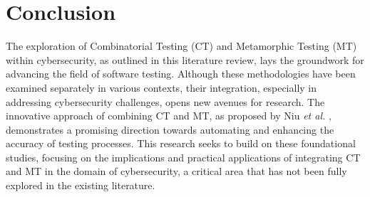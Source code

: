 \section{Conclusion}

The exploration of Combinatorial Testing (CT) and Metamorphic Testing (MT) within cybersecurity, as outlined in this literature review, lays the groundwork for advancing the field of software testing. Although these methodologies have been examined separately in various contexts, their integration, especially in addressing cybersecurity challenges, opens new avenues for research. The innovative approach of combining CT and MT, as proposed by Niu \textit{et al.} \cite{comer}, demonstrates a promising direction towards automating and enhancing the accuracy of testing processes. This research seeks to build on these foundational studies, focusing on the implications and practical applications of integrating CT and MT in the domain of cybersecurity, a critical area that has not been fully explored in the existing literature.

\newpage
